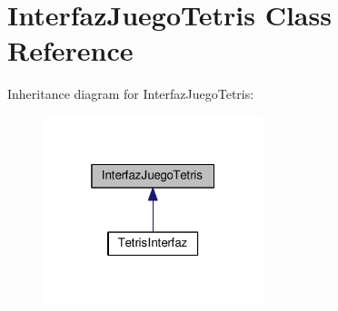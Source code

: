 \hypertarget{class_interfaz_juego_tetris}{}\section{Interfaz\+Juego\+Tetris Class Reference}
\label{class_interfaz_juego_tetris}


Inheritance diagram for Interfaz\+Juego\+Tetris\+:
\nopagebreak
\begin{figure}[H]
\begin{center}
\leavevmode
\includegraphics[width=181pt]{class_interfaz_juego_tetris__inherit__graph}
\end{center}
\end{figure}
